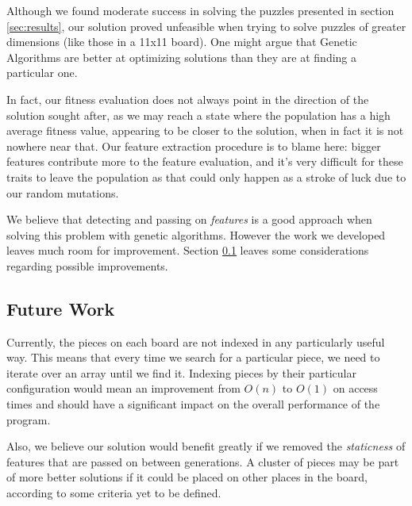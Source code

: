 \documentclass{llncs}
\begin{document}
Although we found moderate success in solving the puzzles presented in section \ref{sec:results}, our solution proved unfeasible when trying to solve puzzles of greater dimensions (like those in a 11x11 board). One might argue that Genetic Algorithms are better at optimizing solutions than they are at finding a particular one.

In fact, our fitness evaluation does not always point in the direction of the solution sought after, as we may reach a state where the population has a high average fitness value, appearing to be closer to the solution, when in fact it is not nowhere near that. Our feature extraction procedure is to blame here: bigger features contribute more to the feature evaluation, and it's very difficult for these traits to leave the population as that could only happen as a stroke of luck due to our random mutations.

We believe that detecting and passing on \textit{features} is a good approach when solving this problem with genetic algorithms. However the work we developed leaves much room for improvement. Section \ref{sec:future_work} leaves some considerations regarding possible improvements.

\subsection{Future Work}\label{sec:future_work}

Currently, the pieces on each board are not indexed in any particularly useful way. This means that every time we search for a particular piece, we need to iterate over an array until we find it. Indexing pieces by their particular configuration would mean an improvement from $O(n)$ to $O(1)$ on access times and should have a significant impact on the overall performance of the program.

Also, we believe our solution would benefit greatly if we removed the \textit{staticness} of features that are passed on between generations. A cluster of pieces may be part of more better solutions if it could be placed on other places in the board, according to some criteria yet to be defined.





\newpage
\end{document}
